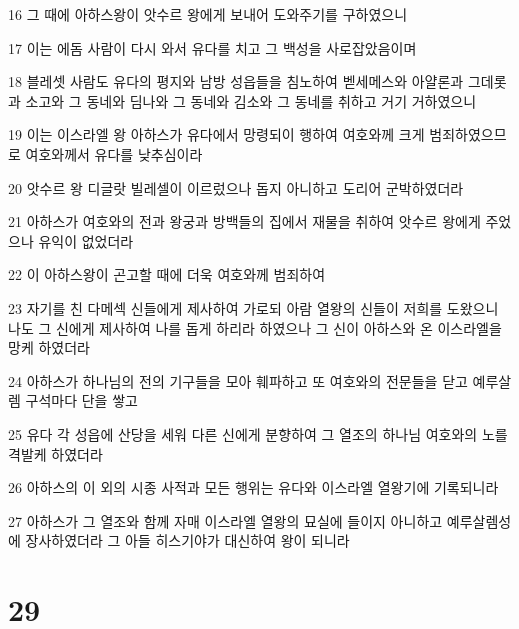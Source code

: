 \par 16 그 때에 아하스왕이 앗수르 왕에게 보내어 도와주기를 구하였으니
\par 17 이는 에돔 사람이 다시 와서 유다를 치고 그 백성을 사로잡았음이며
\par 18 블레셋 사람도 유다의 평지와 남방 성읍들을 침노하여 벧세메스와 아얄론과 그데롯과 소고와 그 동네와 딤나와 그 동네와 김소와 그 동네를 취하고 거기 거하였으니
\par 19 이는 이스라엘 왕 아하스가 유다에서 망령되이 행하여 여호와께 크게 범죄하였으므로 여호와께서 유다를 낮추심이라
\par 20 앗수르 왕 디글랏 빌레셀이 이르렀으나 돕지 아니하고 도리어 군박하였더라
\par 21 아하스가 여호와의 전과 왕궁과 방백들의 집에서 재물을 취하여 앗수르 왕에게 주었으나 유익이 없었더라
\par 22 이 아하스왕이 곤고할 때에 더욱 여호와께 범죄하여
\par 23 자기를 친 다메섹 신들에게 제사하여 가로되 아람 열왕의 신들이 저희를 도왔으니 나도 그 신에게 제사하여 나를 돕게 하리라 하였으나 그 신이 아하스와 온 이스라엘을 망케 하였더라
\par 24 아하스가 하나님의 전의 기구들을 모아 훼파하고 또 여호와의 전문들을 닫고 예루살렘 구석마다 단을 쌓고
\par 25 유다 각 성읍에 산당을 세워 다른 신에게 분향하여 그 열조의 하나님 여호와의 노를 격발케 하였더라
\par 26 아하스의 이 외의 시종 사적과 모든 행위는 유다와 이스라엘 열왕기에 기록되니라
\par 27 아하스가 그 열조와 함께 자매 이스라엘 열왕의 묘실에 들이지 아니하고 예루살렘성에 장사하였더라 그 아들 히스기야가 대신하여 왕이 되니라

\chapter{29}

